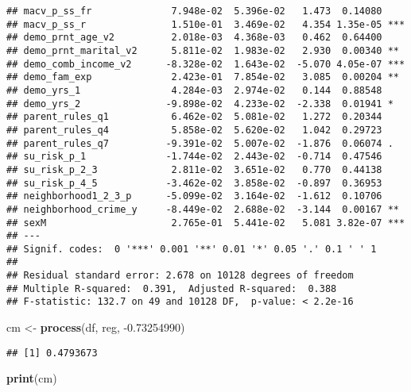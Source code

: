 \documentclass[]{article}
\newenvironment{Shaded}{\begin{snugshade}}{\end{snugshade}}
\newcommand{\FloatTok}[1]{\textcolor[rgb]{0.00,0.00,0.81}{#1}}
\newcommand{\KeywordTok}[1]{\textcolor[rgb]{0.13,0.29,0.53}{\textbf{#1}}}
\newcommand{\NormalTok}[1]{#1}
\newcommand{\StringTok}[1]{\textcolor[rgb]{0.31,0.60,0.02}{#1}}
\begin{document}
\begin{verbatim}
## macv_p_ss_fr              7.948e-02  5.396e-02   1.473  0.14080    
## macv_p_ss_r               1.510e-01  3.469e-02   4.354 1.35e-05 ***
## demo_prnt_age_v2          2.018e-03  4.368e-03   0.462  0.64400    
## demo_prnt_marital_v2      5.811e-02  1.983e-02   2.930  0.00340 ** 
## demo_comb_income_v2      -8.328e-02  1.643e-02  -5.070 4.05e-07 ***
## demo_fam_exp              2.423e-01  7.854e-02   3.085  0.00204 ** 
## demo_yrs_1                4.284e-03  2.974e-02   0.144  0.88548    
## demo_yrs_2               -9.898e-02  4.233e-02  -2.338  0.01941 *  
## parent_rules_q1           6.462e-02  5.081e-02   1.272  0.20344    
## parent_rules_q4           5.858e-02  5.620e-02   1.042  0.29723    
## parent_rules_q7          -9.391e-02  5.007e-02  -1.876  0.06074 .  
## su_risk_p_1              -1.744e-02  2.443e-02  -0.714  0.47546    
## su_risk_p_2_3             2.811e-02  3.651e-02   0.770  0.44138    
## su_risk_p_4_5            -3.462e-02  3.858e-02  -0.897  0.36953    
## neighborhood1_2_3_p      -5.099e-02  3.164e-02  -1.612  0.10706    
## neighborhood_crime_y     -8.449e-02  2.688e-02  -3.144  0.00167 ** 
## sexM                      2.765e-01  5.441e-02   5.081 3.82e-07 ***
## ---
## Signif. codes:  0 '***' 0.001 '**' 0.01 '*' 0.05 '.' 0.1 ' ' 1
## 
## Residual standard error: 2.678 on 10128 degrees of freedom
## Multiple R-squared:  0.391,  Adjusted R-squared:  0.388 
## F-statistic: 132.7 on 49 and 10128 DF,  p-value: < 2.2e-16
\end{verbatim}

\begin{Shaded}
\begin{Highlighting}[]
\NormalTok{cm <-}\StringTok{ }\KeywordTok{process}\NormalTok{(df, reg, }\FloatTok{-0.73254990}\NormalTok{)}
\end{Highlighting}
\end{Shaded}

\begin{verbatim}
## [1] 0.4793673
\end{verbatim}

\begin{Shaded}
\begin{Highlighting}[]
\KeywordTok{print}\NormalTok{(cm)}
\end{Highlighting}
\end{Shaded}
\end{document}
